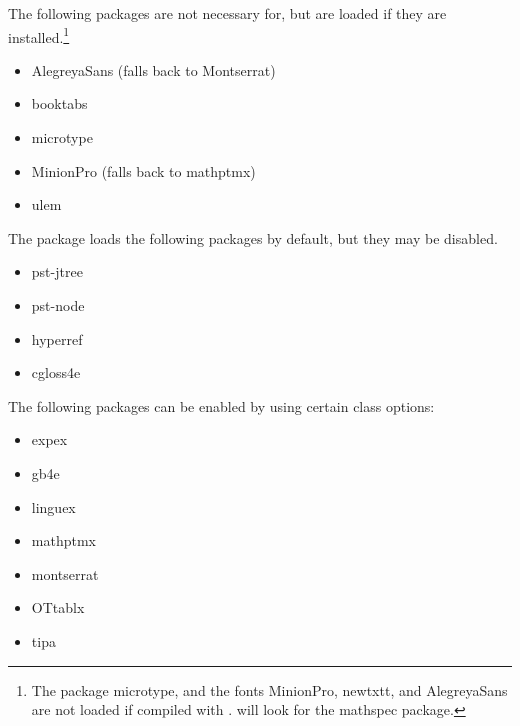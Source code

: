 \documentclass[11pt, tipa, color]{./lingdoc}
\newcommand{\Package}[1]{\textsf{{#1}}}
\begin{document}
    \noindent The following packages are not necessary for, but are loaded if they are installed.\footnote{The package \Package{microtype}, and the fonts \Package{MinionPro}, \Package{newtxtt}, and \Package{AlegreyaSans} are not loaded if compiled with \XeLaTeX. \XeLaTeX will look for the \Package{mathspec} package.}
    
      \begin{multicols}{2}
      
	\begin{itemize}
	    \item \Package{AlegreyaSans} (falls back to \Package{Montserrat})
	    \item \Package{booktabs}
	    \item \Package{microtype}
	    \item \Package{MinionPro} (falls back to \Package{mathptmx})
	    \item \Package{ulem}
	\end{itemize}

      \end{multicols}
      
    \noindent The package loads the following packages by default, but they may be disabled.
    
    
      \begin{multicols}{2}\raggedcolumns
	\begin{itemize}
	  \item \Package{pst-jtree}
	  \item \Package{pst-node}
	  \item \Package{hyperref}
	  \item \Package{cgloss4e}
	\end{itemize}

      \end{multicols}
      
    \noindent The following packages can be enabled by using certain class options:
    
      \begin{multicols}{2}\raggedcolumns

	\begin{itemize}
	  \item \Package{expex}
	  \item \Package{gb4e}
	  \item \Package{linguex}
	  \item \Package{mathptmx}
	  \item \Package{montserrat}
	  \item \Package{OTtablx}
	  \item \Package{tipa}
	\end{itemize}
      \end{multicols}
\end{document}
